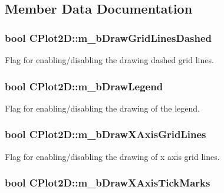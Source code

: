 \subsection{Member Data Documentation}
\hypertarget{class_c_plot2_d_ac340112b317acfbd92736155a281fc4a}{
\subsubsection[{m\-\_\-b\-Draw\-Grid\-Lines\-Dashed}]{\setlength{\rightskip}{0pt plus 5cm}bool C\-Plot2\-D\-::m\-\_\-b\-Draw\-Grid\-Lines\-Dashed\hspace{0.3cm}{\ttfamily [protected]}}}\label{class_c_plot2_d_ac340112b317acfbd92736155a281fc4a}
Flag for enabling/disabling the drawing dashed grid lines. \hypertarget{class_c_plot2_d_a14a8fe2cd70455c3515c5b7224e11526}{
\subsubsection[{m\-\_\-b\-Draw\-Legend}]{\setlength{\rightskip}{0pt plus 5cm}bool C\-Plot2\-D\-::m\-\_\-b\-Draw\-Legend\hspace{0.3cm}{\ttfamily [protected]}}}\label{class_c_plot2_d_a14a8fe2cd70455c3515c5b7224e11526}
Flag for enabling/disabling the drawing of the legend. \hypertarget{class_c_plot2_d_a577e9103e57c69d778d27eee966761cd}{
\subsubsection[{m\-\_\-b\-Draw\-X\-Axis\-Grid\-Lines}]{\setlength{\rightskip}{0pt plus 5cm}bool C\-Plot2\-D\-::m\-\_\-b\-Draw\-X\-Axis\-Grid\-Lines\hspace{0.3cm}{\ttfamily [protected]}}}\label{class_c_plot2_d_a577e9103e57c69d778d27eee966761cd}
Flag for enabling/disabling the drawing of x axis grid lines. \hypertarget{class_c_plot2_d_abac7a667e24766f684bcce6d6215741d}{
\subsubsection[{m\-\_\-b\-Draw\-X\-Axis\-Tick\-Marks}]{\setlength{\rightskip}{0pt plus 5cm}bool C\-Plot2\-D\-::m\-\_\-b\-Draw\-X\-Axis\-Tick\-Marks\hspace{0.3cm}{\ttfamily [protected]}}}\label{class_c_plot2_d_abac7a667e24766f684bcce6d6215741d}
